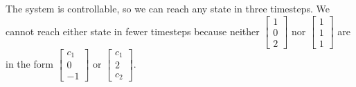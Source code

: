{\begin{enumerate}
        \qitem
        The system is controllable, so we can reach any state in three timesteps.
        We cannot reach either state in fewer timesteps because neither $\begin{bmatrix} 1 \\ 0 \\ 2 \end{bmatrix}$ nor $\begin{bmatrix} 1 \\ 1 \\ 1 \end{bmatrix}$ are in the form $\begin{bmatrix} c_1 \\ 0 \\ -1 \end{bmatrix}$ or $\begin{bmatrix} c_1 \\ 2 \\ c_2 \end{bmatrix}$.
    
    \end{enumerate}
}